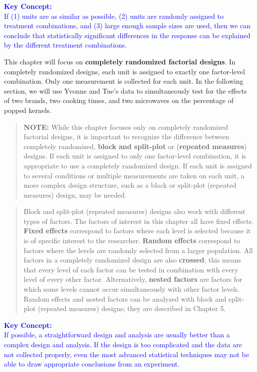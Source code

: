 \documentclass[
]{book}
\begin{document}
\textbf{\textcolor{blue}{Key Concept:}}\\
\textcolor{blue}{If (1) units are as similar as possible, (2) units are randomly assigned to treatment combinations, and (3) large enough sample sizes are used, then we can conclude that statistically significant differences in the response can be explained by the different treatment combinations.}

This chapter will focus on \textbf{completely randomized factorial designs}. In completely randomized designs, each unit is assigned to exactly one factor-level combination. Only one measurement is collected for each unit. In the following section, we will use Yvonne and Tue's data to simultaneously test for the effects of two brands, two cooking times, and two microwaves on the percentage of popped kernels.

\begin{quote}
\textbf{NOTE:} While this chapter focuses only on completely randomized factorial designs, it is important to recognize the difference between completely randomized, \textbf{block and split-plot} or (\textbf{repeated measures}) designs. If each unit is assigned to only one factor-level combination, it is appropriate to use a completely randomized design. If each unit is assigned to several conditions or multiple measurements are taken on each unit, a more complex design structure, such as a block or split-plot (repeated measures) design, may be needed.
\end{quote}

\begin{quote}
Block and split-plot (repeated measures) designs also work with different types of factors. The factors of interest in this chapter all have fixed effects. \textbf{Fixed effects} correspond to factors where each level is selected because it is of specific interest to the researcher. \textbf{Random effects} correspond to factors where the levels are randomly selected from a larger population. All factors in a completely randomized design are also \textbf{crossed}; this means that every level of each factor can be tested in combination with every level of every other factor. Alternatively, \textbf{nested factors} are factors for which some levels cannot occur simultaneously with other factor levels. Random effects and nested factors can be analyzed with block and split-plot (repeated measures) designs; they are described in Chapter 5.
\end{quote}

\textbf{\textcolor{blue}{Key Concept:}}\\
\textcolor{blue}{If possible, a straightforward design and analysis are usually better than a complex design and analysis. If the design is too complicated and the data are not collected properly, even the most advanced statistical techniques may not be able to draw appropriate conclusions from an experiment.}
\end{document}
